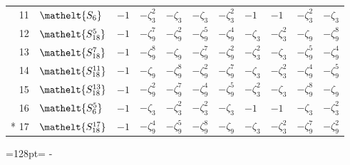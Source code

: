 \documentclass[10pt,a4paper]{article}
\newcommand{\needspace}[1]{\par\penalty-100\begingroup\dimen0=#1\relax\dimen2=\pagegoal
  \advance\dimen2-\pagetotal\ifdim\dimen0>\dimen2\relax\ifdim\dimen2>0pt\vfil\break\fi\fi
  \endgroup}
\numberwithin{equation}{section}
\newcommand{\eltfont}[1]{{\let\sigma\eltsigma\mathelt{#1}}}
\newcommand{\cls}[1]{\eltfont{#1}}
\newcommand{\rootunity}[1]{\zeta_{#1}}
\begin{document}
{\begin{longtable}{@{}rllllllllll@{}}
11 & $\cls{S_{6}}$ & $-1$ & $-\rootunity{3}^{2}$ & $-\rootunity{3}$ & $-\rootunity{3}$ & $-\rootunity{3}^{2}$ & $-1$ & $-1$ & $-\rootunity{3}^{2}$ & $-\rootunity{3}$\\
12 & $\cls{S_{18}^{5}}$ & $-1$ & $-\rootunity{9}^{7}$ & $-\rootunity{9}^{2}$ & $-\rootunity{9}^{5}$ & $-\rootunity{9}^{4}$ & $-\rootunity{3}$ & $-\rootunity{3}^{2}$ & $-\rootunity{9}$ & $-\rootunity{9}^{8}$\\
13 & $\cls{S_{18}^{7}}$ & $-1$ & $-\rootunity{9}^{8}$ & $-\rootunity{9}$ & $-\rootunity{9}^{7}$ & $-\rootunity{9}^{2}$ & $-\rootunity{3}^{2}$ & $-\rootunity{3}$ & $-\rootunity{9}^{5}$ & $-\rootunity{9}^{4}$\\
14 & $\cls{S_{18}^{11}}$ & $-1$ & $-\rootunity{9}$ & $-\rootunity{9}^{8}$ & $-\rootunity{9}^{2}$ & $-\rootunity{9}^{7}$ & $-\rootunity{3}$ & $-\rootunity{3}^{2}$ & $-\rootunity{9}^{4}$ & $-\rootunity{9}^{5}$\\
15 & $\cls{S_{18}^{13}}$ & $-1$ & $-\rootunity{9}^{2}$ & $-\rootunity{9}^{7}$ & $-\rootunity{9}^{4}$ & $-\rootunity{9}^{5}$ & $-\rootunity{3}^{2}$ & $-\rootunity{3}$ & $-\rootunity{9}^{8}$ & $-\rootunity{9}$\\
16 & $\cls{S_{6}^{5}}$ & $-1$ & $-\rootunity{3}$ & $-\rootunity{3}^{2}$ & $-\rootunity{3}^{2}$ & $-\rootunity{3}$ & $-1$ & $-1$ & $-\rootunity{3}$ & $-\rootunity{3}^{2}$\\*
17 & $\cls{S_{18}^{17}}$ & $-1$ & $-\rootunity{9}^{4}$ & $-\rootunity{9}^{5}$ & $-\rootunity{9}^{8}$ & $-\rootunity{9}$ & $-\rootunity{3}$ & $-\rootunity{3}^{2}$ & $-\rootunity{9}^{7}$ & $-\rootunity{9}^{2}$\\
\bottomrule\end{longtable}}
\needspace{128pt}
\end{document}
